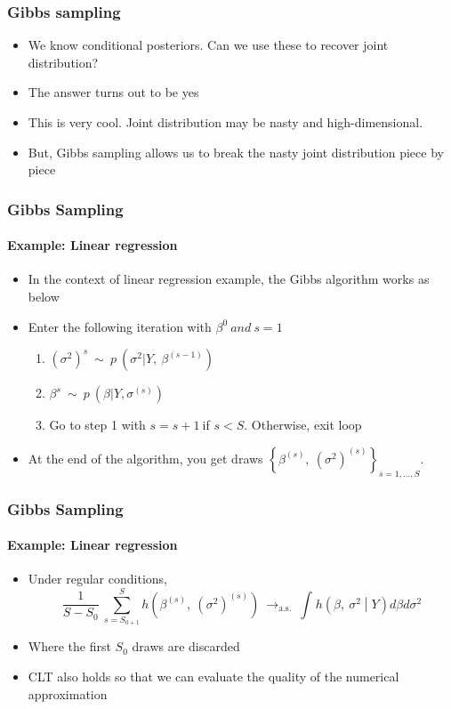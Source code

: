 \documentclass[
  shownotes,
  xcolor={svgnames},
  hyperref={colorlinks,citecolor=DarkBlue,linkcolor=DarkRed,urlcolor=DarkBlue}
  , aspectratio=169]{beamer}
\begin{document}
\begin{frame}[fragile]
\frametitle{Gibbs sampling} 


\begin{itemize}
\item We know conditional posteriors. Can we use these to recover joint distribution?
\medskip
\pause
\item The answer turns out to be yes
\medskip
\item This is very cool. Joint distribution may be nasty and high-dimensional.
\medskip
\item But, Gibbs sampling allows us to break the nasty joint distribution piece by piece

\end{itemize}
 \end{frame}
\begin{frame}[fragile]
\frametitle{Gibbs Sampling} 
\framesubtitle{Example: Linear regression}


\begin{itemize}

\item In the context of linear regression example, the Gibbs algorithm works as below
\medskip
\item Enter the following iteration with $\beta^{0}\ and\ s = 1$
\medskip
\begin{enumerate}
   \item $\left( \sigma^{2} \right)^{s}\ \sim\ p\ (\sigma^{2}|Y,\ \beta^{\left( s - 1 \right)})$
    \medskip

    \item $\beta^{s}\ \sim\ p\ (\beta|Y, \sigma^{(s)} )$
    \medskip
    \item Go to step 1 with $s = s + 1\ $if $s < S$. Otherwise, exit loop
    \end{enumerate}
    \medskip
\item At the end of the algorithm, you get draws $\left\{ \beta^{(s)},\  \left(\sigma^{2}\right)^{(s)} \right\}_{s = 1,\ldots,S}$.

\end{itemize}

 \end{frame}
\begin{frame}[fragile]
\frametitle{Gibbs Sampling} 
\framesubtitle{Example: Linear regression}

\begin{itemize}
\item Under regular conditions,
\medskip
$$ \frac{1}{S - S_{0}}\ \sum_{s = S_{0 + 1}}^{S}{h\left( \beta^{(s)},\ \left( \sigma^{2} \right)^{(s)} \right)}\  \rightarrow_{\text{a.s.}}\ \int_{}^{}{h\left( \beta,\ \sigma^{2} \middle| Y \right)d\beta d\sigma^{2}}$$
\medskip

\item Where the first $S_{0}$ draws are discarded
\medskip
\item CLT also holds so that we can evaluate the quality of the numerical approximation
\end{itemize}
 \end{frame}
\end{document}

